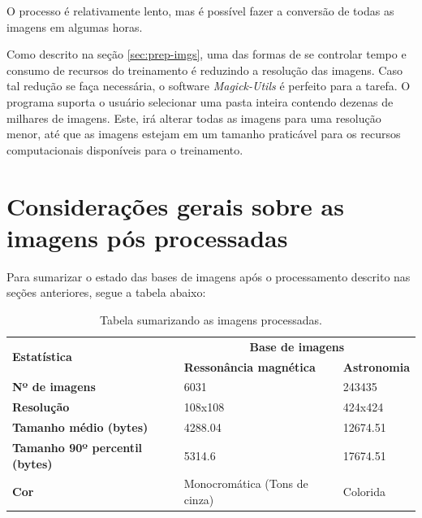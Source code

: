 O processo é relativamente lento, mas é possível fazer a conversão de todas as imagens em algumas horas.

Como descrito na seção \ref{sec:prep-imgs}, uma das formas de se controlar tempo e consumo de recursos do treinamento é reduzindo a resolução das imagens. Caso tal redução se faça necessária, o software \textit{Magick-Utils} \cite{n00mkrad_magickutils_2022} é perfeito para a tarefa. O programa suporta o usuário selecionar uma pasta inteira contendo dezenas de milhares de imagens. Este, irá alterar todas as imagens para uma resolução menor, até que as imagens estejam em um tamanho praticável para os recursos computacionais disponíveis para o treinamento.

\section{Considerações gerais sobre as imagens pós processadas}
\label{sec:desenvolvimento:general-considerations-post-processed-images}

Para sumarizar o estado das bases de imagens após o processamento descrito nas seções anteriores, segue a tabela abaixo:

\begin{table}[H]
    \centering
    \caption{Tabela sumarizando as imagens processadas.}
    \begin{tabular}{|l|l|l|} \hline
        \multirow{2}{*}{\textbf{Estatística}}   & \multicolumn{2}{|c|}{\textbf{Base de imagens}}            \\ \cline{2-3}
                                                & \textbf{Ressonância magnética}    & \textbf{Astronomia}   \\ \hline
        \textbf{Nº de imagens}                  & 6031                              & 243435                \\ \hline
        \textbf{Resolução}                      & 108x108                           & 424x424               \\ \hline            
        \textbf{Tamanho médio (bytes)}          & 4288.04                           & 12674.51              \\ \hline            
        \textbf{Tamanho 90º percentil (bytes)}  & 5314.6                            & 17674.51              \\ \hline            
        \textbf{Cor}                            & Monocromática (Tons de cinza)     & Colorida              \\ \hline            
    \end{tabular}
    \vspace{0.3cm}
    \label{tab:image_considerations}
\end{table}

